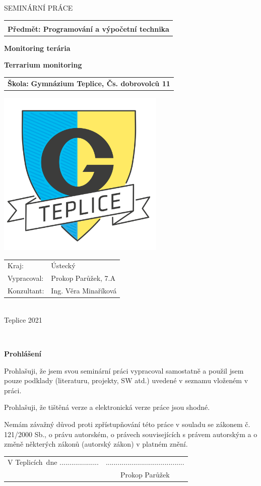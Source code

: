 \documentclass[a4paper,twoside,12pt]{book}
\newcommand{\tb}{\textbf} %
\newcommand{\cvut}{Gymnázium Teplice, Čs. dobrovolců 11}
\newcommand{\ksi}{}
\newcommand{\obor}{Programování a výpočetní technika} %
\newcommand{\druh}{Seminární práce} %
\newcommand{\woman}{} %
\newcommand{\logoCVUT}{\includegraphics[height=8cm]{gympl}}  %
\newcommand{\nazevcz}{Monitoring terária}	%
\newcommand{\nazeven}{Terrarium monitoring}	%
\newcommand{\autor}{Prokop Parůžek}   %
\newcommand{\trida}{7.A} %
\newcommand{\vedouci}{Ing. Věra Minaříková} %
\newcommand{\kde}{Teplicích} %
\newcommand{\prohlaseni}{Prohlašuji, že jsem svou seminární práci vypracoval\woman{} samostatně a použil\woman{} jsem pouze podklady (literaturu, projekty, SW atd.) uvedené v seznamu vloženém v práci. 

Prohlašuji, že tištěná verze a elektronická verze práce jsou shodné. 

Nemám závažný důvod proti zpřístupňování této práce v souladu se zákonem č. 121/2000 Sb., o právu autorském, o právech souvisejících s právem autorským a o změně některých zákonů (autorský zákon) v platném znění. } %
\begin{document}
\thispagestyle{empty}

\begin{center}
   {\Large \MakeUppercase{\druh}}
	\vspace{5mm}

	\begin{tabular}{c}
		\tb{\ksi} \\[3pt]   \tb{Předmět: \obor}\\
	\end{tabular}

	\vspace{10mm}
   {\huge \tb{\nazevcz}\par}
   \vspace{5mm}   {\huge \tb{\nazeven}\par}
   
	 \vspace{10mm}
	 \begin{tabular}{c}
			 \LARGE{\tb{Škola:} \tb{\cvut}}
	\end{tabular}

   \vspace{10mm} \logoCVUT \vspace{15mm} 

   \vfill
   {\large
	\begin{tabular}{ll}
	Kraj: & Ústecký\\
	Vypracoval: & \autor, \trida\\
	Konzultant: & \vedouci\\
	\end{tabular}
	 }\\
\vspace{1cm}
\LARGE{Teplice 2021}
\end{center}

\clearpage{\pagestyle{empty}\cleardoublepage} %

\newpage %
\thispagestyle{empty}  %

~ %
\vfill %

\tb{Prohlášení} %

\vspace{1em} %
\prohlaseni

\vspace{2em}  %
\hspace{-0.5em}\begin{tabularx}{\textwidth}{X c}  %
V \kde\ dne .................... &........................................ \\	%
	& \autor
\end{tabularx}	%
\end{document}
